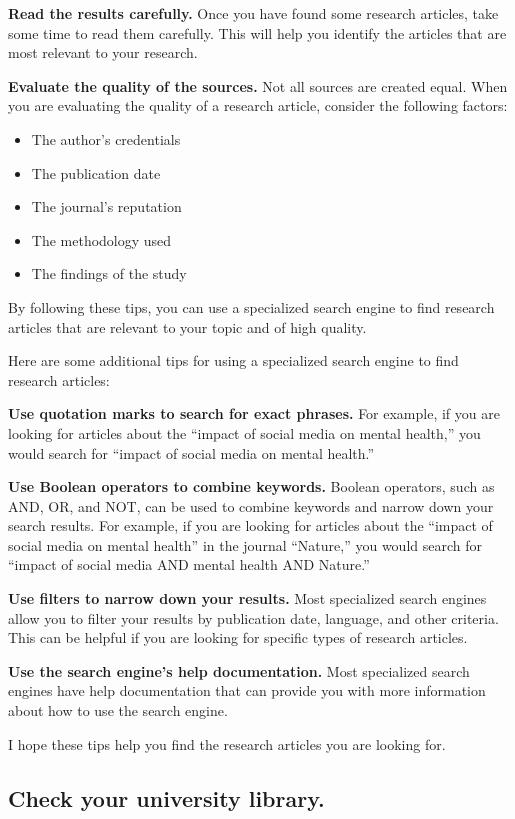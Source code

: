 \documentclass[
]{book}
\begin{document}
\textbf{Read the results carefully.} Once you have found some research articles, take some time to read them carefully. This will help you identify the articles that are most relevant to your research.

\textbf{Evaluate the quality of the sources.} Not all sources are created equal. When you are evaluating the quality of a research article, consider the following factors:

\begin{itemize}
\item
  The author's credentials
\item
  The publication date
\item
  The journal's reputation
\item
  The methodology used
\item
  The findings of the study
\end{itemize}

By following these tips, you can use a specialized search engine to find research articles that are relevant to your topic and of high quality.

Here are some additional tips for using a specialized search engine to find research articles:

\textbf{Use quotation marks to search for exact phrases.} For example, if you are looking for articles about the ``impact of social media on mental health,'' you would search for ``impact of social media on mental health.''

\textbf{Use Boolean operators to combine keywords.} Boolean operators, such as AND, OR, and NOT, can be used to combine keywords and narrow down your search results. For example, if you are looking for articles about the ``impact of social media on mental health'' in the journal ``Nature,'' you would search for ``impact of social media AND mental health AND Nature.''

\textbf{Use filters to narrow down your results.} Most specialized search engines allow you to filter your results by publication date, language, and other criteria. This can be helpful if you are looking for specific types of research articles.

\textbf{Use the search engine's help documentation.} Most specialized search engines have help documentation that can provide you with more information about how to use the search engine.

I hope these tips help you find the research articles you are looking for.

\subsection*{Check your university library.}\label{check-your-university-library.}
\end{document}
